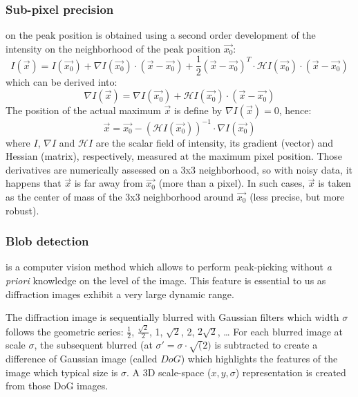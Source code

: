 \documentclass[preprint]{iucr}
\begin{document}
\subsubsection{Sub-pixel precision}
\label{subpixel}
on the peak position is obtained using a second order development of the
intensity on the neighborhood of the peak position $\overrightarrow{x_0}$:
$$ I(\overrightarrow{x}) = I(\overrightarrow{x_0}) + \nabla
I(\overrightarrow{x_0})\cdot (\overrightarrow{x}-\overrightarrow{x_0}) +
\frac{1}{2} (\overrightarrow{x}-\overrightarrow{x_0})^T\cdot\mathcal{H}
I(\overrightarrow{x_0})\cdot(\overrightarrow{x}-\overrightarrow{x_0})$$ which
can be derived into:
$$\nabla I(\overrightarrow{x}) =\nabla I(\overrightarrow{x_0}) +
\mathcal{H}I(\overrightarrow{x_0})\cdot(\overrightarrow{x}-\overrightarrow{x_0})$$
The position of the actual maximum $\overrightarrow{x}$ is define by
$\nabla I(\overrightarrow{x})=0$, hence:
$$\overrightarrow{x} = \overrightarrow{x_0} - (\mathcal{H}
I(\overrightarrow{x_0}))^{-1}\cdot\nabla I(\overrightarrow{x_0})$$ where $I$,
$\nabla I$ and $\mathcal{H} I$ are the scalar field of intensity, its gradient
(vector) and Hessian (matrix), respectively, measured at the maximum pixel position.
Those derivatives are numerically assessed on a 3x3 neighborhood, so with noisy
data, it happens that $\overrightarrow{x}$ is far away from
$\overrightarrow{x_0}$ (more than a pixel). In such cases, $\overrightarrow{x}$
is taken as the center of mass of the 3x3 neighborhood around
$\overrightarrow{x_0}$ (less precise, but more robust).

\subsubsection{Blob detection}
\label{blob}
is a computer vision method which allows to perform peak-picking without
\textit{a priori} knowledge on the level of the image.
This feature is essential to us as diffraction images exhibit a very large
dynamic range.

The diffraction image is sequentially blurred with Gaussian filters which
width $\sigma$ follows the geometric series: $\frac{1}{2}$,
$\frac{\sqrt{2}}{2}$, 1, $\sqrt{2}$, 2, $2\sqrt{2}$, \ldots
For each blurred image at scale $\sigma$, the subsequent blurred (at
$\sigma'=\sigma\cdot\sqrt(2)$
is subtracted to create a difference of Gaussian
image (called $DoG$) which highlights the features of the image which typical
size is $\sigma$.
A 3D scale-space ($x,y,\sigma$) representation is created from those DoG images.
\end{document}
